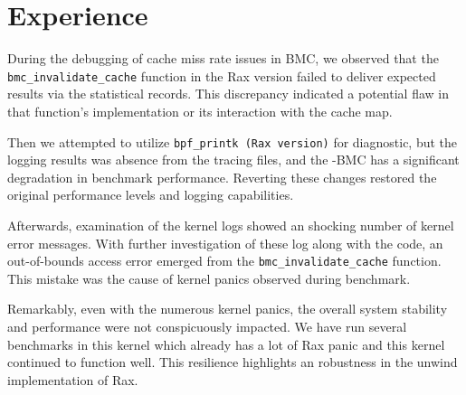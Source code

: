 \section{Experience}
During the debugging of cache miss rate issues in BMC, we observed that the
\texttt{bmc\_invalidate\_cache} function in the Rax version failed to deliver expected
    results via the statistical records.
This discrepancy indicated a potential flaw in that function's implementation
    or its interaction with the cache map.

    Then we attempted to utilize \texttt{bpf\_printk (Rax version)} for diagnostic, but
    the logging results was absence from the tracing files,
    and the \projname{}-BMC has a significant degradation in benchmark performance.
Reverting these changes restored the original performance levels and logging capabilities.

Afterwards, examination of the kernel logs showed an shocking number of kernel error messages.
With further investigation of these log along with the code, an out-of-bounds access error
emerged from the \texttt{bmc\_invalidate\_cache} function.
This mistake was the cause of kernel panics observed during benchmark.

Remarkably, even with the numerous kernel panics, the overall system stability
    and performance were not conspicuously impacted.
We have run several benchmarks in this kernel which already has a lot of Rax panic
    and this kernel continued to function well.
This resilience highlights an robustness in the unwind implementation of Rax.

